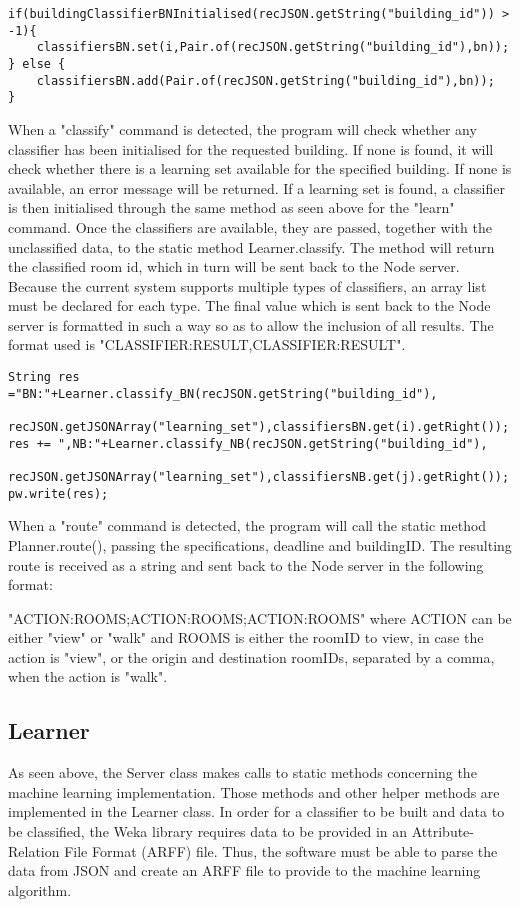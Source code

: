 \begin{lstlisting}
if(buildingClassifierBNInitialised(recJSON.getString("building_id")) > -1){
	classifiersBN.set(i,Pair.of(recJSON.getString("building_id"),bn));
} else {
	classifiersBN.add(Pair.of(recJSON.getString("building_id"),bn));
}
\end{lstlisting}

When a "classify" command is detected, the program will check whether any classifier has been initialised for the requested building. If none is found, it will check whether there is a learning set available for the specified building. If none is available, an error message will be returned. If a learning set is found, a classifier is then initialised through the same method as seen above for the "learn" command. Once the classifiers are available, they are passed, together with the unclassified data, to the static method Learner.classify. The method will return the classified room id, which in turn will be sent back to the Node server. Because the current system supports multiple types of classifiers, an array list must be declared for each type. The final value which is sent back to the Node server is formatted in such a way so as to allow the inclusion of all results. The format used is "CLASSIFIER:RESULT,CLASSIFIER:RESULT".
\begin{lstlisting}
String res ="BN:"+Learner.classify_BN(recJSON.getString("building_id"),
                  	recJSON.getJSONArray("learning_set"),classifiersBN.get(i).getRight());
res += ",NB:"+Learner.classify_NB(recJSON.getString("building_id"),
              	recJSON.getJSONArray("learning_set"),classifiersNB.get(j).getRight());
pw.write(res);
\end{lstlisting} 

When a "route" command is detected, the program will call the static method Planner.route(), passing the specifications, deadline and buildingID. The resulting route is received as a string and sent back to the Node server in the following format: 

\noindent "ACTION:ROOMS;ACTION:ROOMS;ACTION:ROOMS" where ACTION can be either "view" or "walk" and ROOMS is either the roomID to view, in case the action is "view", or the origin and destination roomIDs, separated by a comma, when the action is "walk".

\subsection{Learner}
As seen above, the Server class makes calls to static methods concerning the machine learning implementation. Those methods and other helper methods are implemented in the Learner class. In order for a classifier to be built and data to be classified, the Weka library requires data to be provided in an Attribute-Relation File Format (ARFF) file. Thus, the software must be able to parse the data from JSON and create an ARFF file to provide to the machine learning algorithm.

